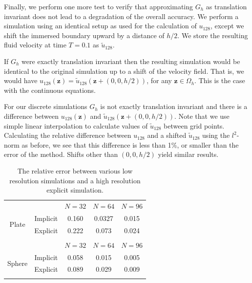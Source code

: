 \documentclass[preprint,12pt]{elsarticle}
\newcommand{\B}[1]{\mathbf{#1}}
\newcommand{\TableTopSpace}{\rule{0cm}{2.625ex}}
\newcommand{\New}[1]{{\color{Red}#1}}
\begin{document}
\New{
Finally, we perform one more test to verify that approximating $G_h$ as translation invariant does not lead to a degradation of the overall accuracy. We perform a simulation using an identical setup as used for the calculation of $u_{128}$, except we shift the immersed boundary upward by a distance of $h/2$. We store the resulting fluid velocity at time $T=0.1$ as $\tilde{u}_{128}$.

If $G_h$ were exactly translation invariant then the resulting simulation would be identical to the original simulation up to a shift of the velocity field. That is, we would have $u_{128}(\B{z}) = \tilde{u}_{128}(\B{z} + (0,0,h/2))$, for any $\B{z}\in\Omega_h$. This is the case with the continuous equations.

For our discrete simulations $G_h$ is not exactly translation invariant and there is a difference between $u_{128}(\B{z})$ and $\tilde{u}_{128}(\B{z} + (0,0,h/2))$. Note that we use simple linear interpolation to calculate values of $\tilde{u}_{128}$ between grid points. 
Calculating the relative difference between $u_{128}$ and a shifted $\tilde{u}_{128}$  using the $l^2$-norm as before, we see that this difference is less than 1\%, or smaller than the error of the method. Shifts other than $(0,0,h/2)$ yield similar results.
}

\begin{table}
\caption{The relative error between various low resolution simulations and a high resolution explicit simulation.}
\label{table:TotalError}
\begin{center}

\begin{tabular}{c c c c c}
  &  & $N=32$ & $N=64$ & $N=96$ \\
\cline{3-5}
\multirow{2}{*}{Plate}
& \multicolumn{1}{c|}{Implicit} & \TableTopSpace
   0.160 & 0.0327 & 0.015 \\
& \multicolumn{1}{c|}{Explicit} & \TableTopSpace
   0.222 & 0.073 & 0.024 \\
\vspace{.15 cm}
\\
  &  & $N=32$ & $N=64$ & $N=96$ \\
\cline{3-5}
\multirow{2}{*}{Sphere}
& \multicolumn{1}{c|}{Implicit} & \TableTopSpace
	0.058 & 0.015 & 0.005 \\
& \multicolumn{1}{c|}{Explicit} & \TableTopSpace
  0.089 & 0.029 & 0.009 \\
\vspace{.15 cm}
\end{tabular}
   
\end{center}
\end{table}
\end{document}
